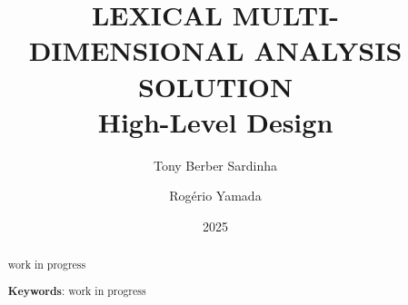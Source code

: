 \title{
    \LARGE \MakeUppercase{Lexical Multi-Dimensional Analysis Solution} \\
    \Large High-Level Design
}
\author{Tony Berber Sardinha \and Rogério Yamada} %
\date{2025}
\maketitle
\begin{abstract}
    work in progress \citep{biberVariationSpeechWriting1988}

    \vspace{1em}
    \textbf{Keywords}: work in progress
\end{abstract}

\tableofcontents
